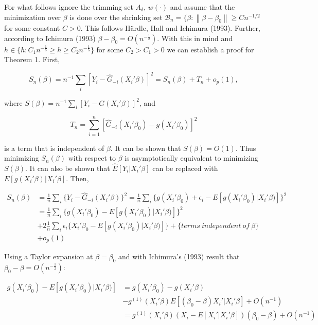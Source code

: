 \documentclass[a4paper]{article}
\newcommand{\norm}[1]{\left\lVert#1\right\rVert}
\begin{document}
For what follows ignore the trimming set $A_\delta$, $w(\cdot)$ and assume that the minimization over $\beta$ is done over the shrinking set $\mathcal{B}_n = \{ \beta : \norm{\beta - \beta_0} \geq Cn^{-1/2}$ for some constant $ C > 0$. This follows H\"ardle, Hall and Ichimura (1993). Further, according to Ichimura (1993) $\beta - \beta_0 = O(n^{-\frac{1}{2}})$. With this in mind and $ h \in \{h : C_1n^{-\frac{1}{5}} \geq h \geq C_2n^{-\frac{1}{5}}\}$ for some $C_2 > C_1 > 0$ we can establish a proof for Theorem 1. First,

\begin{equation}
S_n(\beta) = n^{-1} \sum_i[Y_i - \hat{G}_{-i}(X_i'\beta)]^2 = S_n(\beta) + T_n + o_p(1),
\end{equation}  

where $S(\beta) = n^{-1} \sum_i [Y_i - G(X_i'\beta)]^2$, and

\[ T_n = \sum_{i=1}^{n}[\hat{G}_{-i}(X_i'\beta_0) - g(X_i'\beta_0)]^2 \]

is a term that is independent of $\beta$. It can be shown that $S(\beta) = O(1)$. Thus minimizing $S_n(\beta)$ with respect to $\beta$ is asymptotically equivalent to minimizing $S(\beta)$. It can also be shown that $\hat{E}[Y_i|X_i'\beta]$ can be replaced with $E[g(X_i'\beta)|X_i'\beta]$. Then,


\begin{align*}
S_{n}(\beta) & =\frac{1}{n}\sum_{i}\{Y_i - \hat{G}_{-i}(X_i'\beta)\}^2 = \frac{1}{n}\sum_{i} \{g(X_i'\beta_0) + \epsilon_i - E[g(X_i'\beta_0)|X_i'\beta)]\}^2 \\
		     & = \frac{1}{n}\sum_{i}\{g(X_i'\beta_0) - E[g(X_i'\beta_0)|X_i'\beta)]\}^2 \\
		     & + 2\frac{1}{n}\sum_i\epsilon_i\{ X_i'\beta_0 - E[g(X_i'\beta_0)|X_i'\beta)]\} + \{ terms\: independent\:of\:\beta \} \\
		     & + o_p(1)
\end{align*}

Using a Taylor expansion at $\beta = \beta_0$ and with Ichimura's (1993) result that $\beta_0 - \beta = O(n^{-\frac{1}{2}})$:

\begin{align*}
g(X_i'\beta_0) - E[g(X_i'\beta_0)|X_i'\beta)] & = g(X_i'\beta_0) - g(X_i'\beta) \\
											 & - g^{(1)}(X_i'\beta)E[(\beta_0 - \beta)X_i'|X_i'\beta] + O(n^{-1}) \\
				                              & = g^{(1)}(X_i'\beta)( X_i - E[X_i'|X_i'\beta])(\beta_0 - \beta) + O(n^{-1})
\end{align*}
\end{document}
